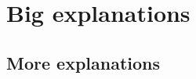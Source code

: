 \section{Big explanations}

\lipsum[2-1]\cite{Dinh2015}


\lipsum[2-1]

\subsection{More explanations}

\lipsum[2-4]\cite{Andrusenko2005}